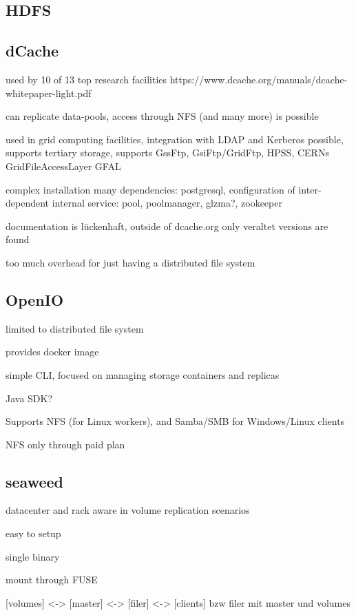 \subsection{HDFS}

\subsection{dCache}

used by 10 of 13 top research facilities 
https://www.dcache.org/manuals/dcache-whitepaper-light.pdf

can replicate data-pools, access through NFS (and many more) is possible

used in grid computing facilities, integration with LDAP and Kerberos possible, supports tertiary storage, supports GssFtp, GsiFtp/GridFtp, HPSS, CERNs GridFileAccessLayer GFAL

complex installation
many dependencies: postgresql, configuration of inter-dependent internal service: pool, poolmanager, glzma?, zookeeper

documentation is lückenhaft, outside of dcache.org only veraltet versions are found

too much overhead for just having a distributed file system

\subsection{OpenIO}

limited to distributed file system

provides docker image

simple CLI, focused on managing storage containers and replicas

Java SDK?

Supports NFS (for Linux workers), and Samba/SMB for Windows/Linux clients

NFS only through paid plan

\subsection{seaweed}

datacenter and rack aware in volume replication scenarios

easy to setup

single binary

mount through FUSE


[volumes] <-> [master] <-> [filer] <-> [clients]
bzw filer mit master und volumes

